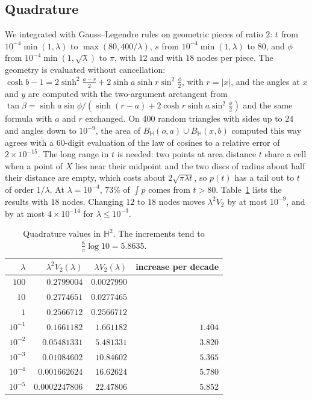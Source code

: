 \documentclass[11pt]{amsart}
\theoremstyle{remark}
\newcommand{\HH}{\mathbb{H}}
\begin{document}
\subsection{Quadrature}
We integrated with Gauss--Legendre rules on geometric pieces of ratio $2$: $t$ from $10^{-4}\min(1,\lambda)$ to
$\max(80,400/\lambda)$, $s$ from $10^{-4}\min(1,\lambda)$ to $80$, and $\phi$ from $10^{-4}\min(1,\sqrt\lambda)$ to
$\pi$, with $12$ and with $18$ nodes per piece. The geometry is evaluated without cancellation: $\cosh b-1=2\sinh^2
\frac{a-r}2+2\sinh a\sinh r\sin^2\frac\phi2$, with $r=|x|$, and the angles at $x$ and $y$ are computed with the two-argument
arctangent from $\tan\beta=\sinh a\sin\phi/(\sinh(r-a)+2\cosh r\sinh a\sin^2\frac\phi2)$ and the same formula with $a$
and $r$ exchanged. On $400$ random triangles with sides up to $24$ and angles down to $10^{-9}$, the area of
$B_\HH(o,a)\cup B_\HH(x,b)$ computed this way agrees with a $60$-digit evaluation of the law of cosines to a relative
error of $2\times10^{-15}$. The long range in $t$ is needed: two points at area distance $t$ share a
cell when a point of $X$ lies near their midpoint and the two discs of radius about half their distance are empty,
which costs about $2\sqrt{\pi\lambda t}$, so $p(t)$ has a tail out to $t$ of order $1/\lambda$. At $\lambda=10^{-4}$,
$73\%$ of $\int p$ comes from $t>80$. Table~\ref{tab:values} lists the results with $18$ nodes. Changing $12$ to $18$
nodes moves $\lambda^2V_2$ by at most $10^{-9}$, and by at most $4\times10^{-14}$ for $\lambda\le10^{-3}$.

\begin{table}[tbp]
\centering
\begin{tabular}{rrrr}
\toprule
$\lambda$ & $\lambda^2V_2(\lambda)$ & $\lambda V_2(\lambda)$ & increase per decade \\
\midrule
$100$ & $0.2799004$ & $0.0027990$ & \\
$10$ & $0.2774651$ & $0.0277465$ & \\
$1$ & $0.2566712$ & $0.2566712$ & \\
$10^{-1}$ & $0.1661182$ & $1.661182$ & $1.404$\\
$10^{-2}$ & $0.05481331$ & $5.481331$ & $3.820$\\
$10^{-3}$ & $0.01084602$ & $10.84602$ & $5.365$\\
$10^{-4}$ & $0.001662624$ & $16.62624$ & $5.780$\\
$10^{-5}$ & $0.0002247806$ & $22.47806$ & $5.852$\\
\bottomrule
\end{tabular}
\caption{Quadrature values in $\HH^2$. The increments tend to $\frac8\pi\log10=5.8635$.}
\label{tab:values}
\end{table}
\end{document}
